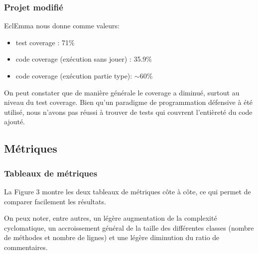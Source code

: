 \documentclass[a4paper,12pt]{report} %
\begin{document}
\subsubsection{Projet modifié}
EclEmma nous donne comme valeurs:
\begin{itemize}
\item test coverage : 71\%
\item code coverage (exécution sans jouer) : 35.9\%
\item code coverage (exécution partie type): $\sim$60\%
\end{itemize}
On peut constater que de manière générale le coverage a diminué, surtout
au niveau du test coverage. Bien qu'un paradigme de programmation
défensive à été utilisé, nous n'avons pas réussi à trouver de tests
qui couvrent l'entièreté du code ajouté.

\subsection{Métriques}
\subsubsection{Tableaux de métriques}
La Figure 3 montre les deux tableaux de métriques côte à côte, ce
qui permet de comparer facilement les résultats.

On peux noter, entre autres, un légère augmentation de la complexité
cyclomatique, un accroissement général de la taille des différentes
classes (nombre de méthodes et nombre de lignes) et une légère diminution
du ratio de commentaires.
\end{document}
